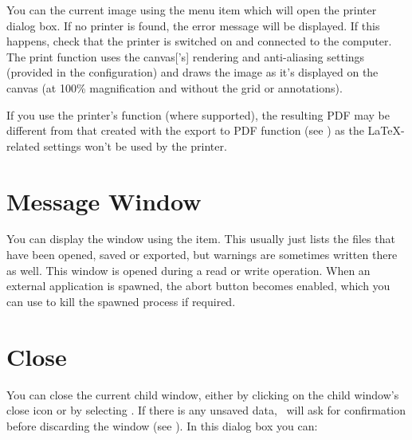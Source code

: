 
You can  the current image using the  menu
item which will open the printer dialog box. If no printer is found,
the error message  will
be displayed. If this happens, check that the printer is switched
on and connected to the computer. The print function uses the
\gls{canvas}['s] \gls{rendering} and \gls{anti-aliasing} settings
(provided in the  configuration) and draws
the image as it's displayed on the \gls{canvas} (at 100\%
magnification and without the grid or annotations).

\begin{information}
If you use the printer's  function (where
supported), the resulting PDF may be different from that created
with the export to PDF function (see )
as the \LaTeX-related settings won't be used by the printer.
\end{information}

\section{Message Window}\label{sec:messages}


You can display the  window using the
 item. This usually just lists the
files that have been opened, saved or exported, but warnings are
sometimes written there as well. This window is opened during a read
or write operation. When an external application is spawned, the
abort button becomes enabled, which you can use to kill the spawned
process if required.

\section{Close}\label{sec:closeimage}


You can close the current child window, either by clicking on the
child window's close icon or by selecting .
If there is any unsaved data, \FlowframTk\ will ask for confirmation
before discarding the window (see ).
In this dialog box you can:

